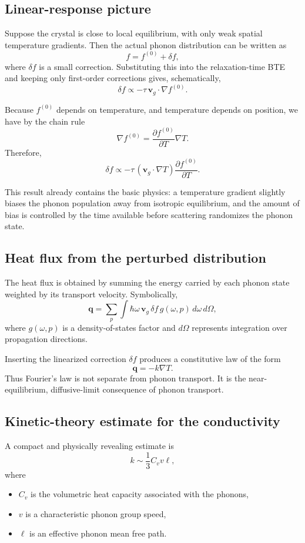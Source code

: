 \documentclass[11pt]{article}
\newcommand{\vvg}{\mathbf{v}_g}
\newcommand{\qvec}{\mathbf{q}}
\begin{document}
\subsection{Linear-response picture}

Suppose the crystal is close to local equilibrium, with only weak spatial temperature gradients. Then the actual phonon distribution can be written as
\[
 f = f^{(0)} + \delta f,
\]
where $\delta f$ is a small correction. Substituting this into the relaxation-time BTE and keeping only first-order corrections gives, schematically,
\[
 \delta f \propto -\tau\, \vvg\cdot \nabla f^{(0)}.
\]

Because $f^{(0)}$ depends on temperature, and temperature depends on position, we have by the chain rule
\[
\nabla f^{(0)} = \frac{\partial f^{(0)}}{\partial T}\nabla T.
\]
Therefore,
\[
 \delta f \propto -\tau\, (\vvg\cdot \nabla T)\frac{\partial f^{(0)}}{\partial T}.
\]

This result already contains the basic physics: a temperature gradient slightly biases the phonon population away from isotropic equilibrium, and the amount of bias is controlled by the time available before scattering randomizes the phonon state.

\subsection{Heat flux from the perturbed distribution}

The heat flux is obtained by summing the energy carried by each phonon state weighted by its transport velocity. Symbolically,
\[
 \qvec = \sum_{p}\int \hbar\omega\, \vvg\, \delta f\, g(\omega,p)\, d\omega\, d\Omega,
\]
where $g(\omega,p)$ is a density-of-states factor and $d\Omega$ represents integration over propagation directions.

Inserting the linearized correction $\delta f$ produces a constitutive law of the form
\[
 \qvec = -k\nabla T.
\]
Thus Fourier's law is not separate from phonon transport. It is the near-equilibrium, diffusive-limit consequence of phonon transport.

\subsection{Kinetic-theory estimate for the conductivity}

A compact and physically revealing estimate is
\[
 k \sim \frac{1}{3} C_v v \ell,
\]
where
\begin{itemize}
    \item $C_v$ is the volumetric heat capacity associated with the phonons,
    \item $v$ is a characteristic phonon group speed,
    \item $\ell$ is an effective phonon mean free path.
\end{itemize}
\end{document}
